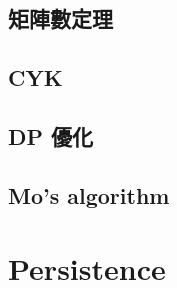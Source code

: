 \subsection{矩陣數定理}

\subsection{CYK}

\subsection{DP 優化}

\subsection{Mo's algorithm}


\section{Persistence}

